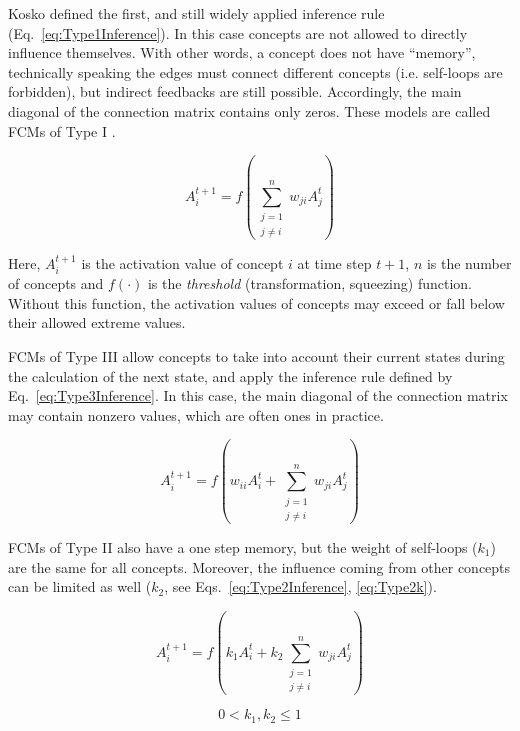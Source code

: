 \documentclass[graybox]{svmult}
\begin{document}
Kosko defined the first, and still widely applied inference rule (Eq.~\ref{eq:Type1Inference}). In this case concepts are not allowed to directly influence themselves. With other words, a concept does not have ``memory'', technically speaking the edges must connect different concepts (i.e. self-loops are forbidden), but indirect feedbacks are still possible. Accordingly, the main diagonal of the connection matrix contains only zeros. These models are called FCMs of Type I \cite{stylios1999mathematical}.

\begin{equation}
\label{eq:Type1Inference}
A_{i}^{t+1} = f \left( \sum_{\substack{j=1\\j \ne i}}^{n} w_{ji}A_{j}^{t} \right)
\end{equation}

Here, $A_i^{t+1}$ is the activation value of concept $i$ at time step $t+1$, $n$ is the number of concepts and $f(\cdot)$ is the \emph{threshold} (transformation, squeezing) function. Without this function, the activation values of concepts may exceed or fall below their allowed extreme values.

FCMs of Type III allow concepts to take into account their current states during the calculation of the next state, and apply the inference rule defined by Eq.~\ref{eq:Type3Inference}. In this case, the main diagonal of the connection matrix may contain nonzero values, which are often ones in practice.

\begin{equation}
\label{eq:Type3Inference}
A_{i}^{t+1} = f \left( w_{ii}A_i^t + \sum_{\substack{j=1\\j \ne i}}^{n} w_{ji}A_{j}^{t} \right)
\end{equation}

FCMs of Type II also have a one step memory, but the weight of self-loops ($k_1$) are the same for all concepts. Moreover, the influence coming from other concepts can be limited as well ($k_2$, see Eqs.~\ref{eq:Type2Inference}, \ref{eq:Type2k}). 

\begin{equation}
\label{eq:Type2Inference}
A_{i}^{t+1} = f \left( k_1 A_i^t + k_2 \sum_{\substack{j=1\\j \ne i}}^{n} w_{ji}A_{j}^{t} \right)
\end{equation}

\begin{equation}
\label{eq:Type2k}
0 < k_1, k_2 \leq 1
\end{equation}
\end{document}
